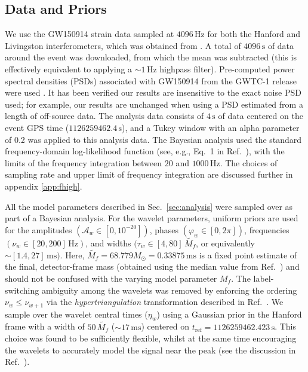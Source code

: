 \subsection{Data and Priors}
\label{sec:details}

We use the GW150914 strain data sampled at $4096\, \mathrm{Hz}$ for both the Hanford and Livingston interferometers, which was obtained from \cite{gwosc, LIGOScientific:2019lzm}.
A total of $4096\,\mathrm{s}$ of data around the event was downloaded, from which the mean was subtracted (this is effectively equivalent to applying a $\sim 1\, \mathrm{Hz}$ highpass filter). 
Pre-computed power spectral densities (PSDs) associated with GW150914 from the GWTC-1 release were used \cite{gwtc1psds}. 
It has been verified our results are insensitive to the exact noise PSD used; for example, our results are unchanged when using a PSD estimated from a length of off-source data.
The analysis data consists of $4\,\mathrm{s}$ of data centered on the event GPS time ($1126259462.4\,\mathrm{s}$), and a Tukey window with an alpha parameter of 0.2 was applied to this analysis data.
The Bayesian analysis used the standard frequency-domain log-likelihood function (see, e.g., Eq.~1 in Ref.~\cite{Finch:2021qph}), with the limits of the frequency integration between $20$ and $1000\, \mathrm{Hz}$.
The choices of sampling rate and upper limit of frequency integration are discussed further in appendix \ref{app:fhigh}.

All the model parameters described in Sec.~\ref{sec:analysis} were sampled over as part of a Bayesian analysis.
For the wavelet parameters, uniform priors are used for the amplitudes $(\mathcal{A}_w \in [0,10^{-20}])$, phases $(\varphi_w \in [0,2\pi])$, frequencies $(\nu_w \in [20,200]\, \mathrm{Hz})$, and widths $(\tau_w \in [4,80]\, \tilde{M_f}$, or equivalently $\sim[1.4,27]\, \mathrm{ms})$.
Here, $\tilde{M_f}=68.779M_\odot=0.33875\,\mathrm{ms}$ is a fixed point estimate of the final, detector-frame mass (obtained using the median value from Ref.~\cite{LIGOScientific:2018mvr}) and should not be confused with the varying model parameter $M_f$.
The label-switching ambiguity among the wavelets was removed by enforcing the ordering 
$ \nu_w \leq \nu_{w+1} $ via the \emph{hypertriangulation} transformation described in Ref.~\cite{Buscicchio:2019rir}.
We sample over the wavelet central times ($\eta_w$) using a Gaussian prior in the Hanford frame with a width of $50\,\tilde{M_f}$ ($\sim 17\,\mathrm{ms}$) centered on $t_\mathrm{ref} = 1126259462.423\,\mathrm{s}$.
This choice was found to be sufficiently flexible, whilst at the same time encouraging the wavelets to accurately model the signal near the peak (see the discussion in Ref.~\cite{Finch:2021qph}).

